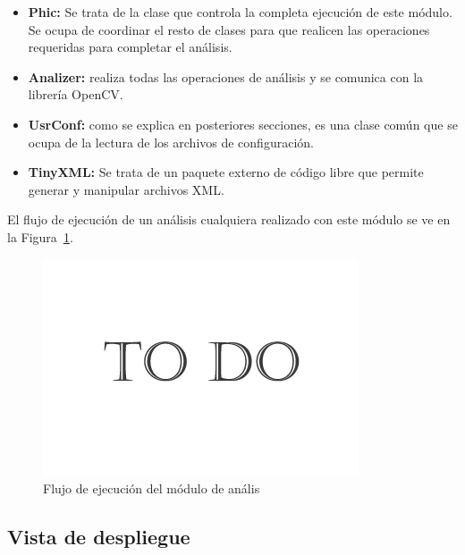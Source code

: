 \begin{itemize}

	\item \textbf{Phic:} Se trata de la clase que controla la completa ejecución de este módulo. Se ocupa de coordinar el resto de clases para que realicen las operaciones requeridas para completar el análisis.
	
	\item \textbf{Analizer:} realiza todas las operaciones de análisis y se comunica con la librería OpenCV.
	
	\item \textbf{UsrConf:} como se explica en posteriores secciones, es una clase común que se ocupa de la lectura de los archivos de configuración.
	
	\item \textbf{TinyXML:} Se trata de un paquete externo de código libre que permite generar y manipular archivos XML.
	
\end{itemize}	
			
El flujo de ejecución de un análisis cualquiera realizado con este módulo se ve en la Figura~\ref{fig:diagramaflujoPHIC}.\\

		\begin{figure}[htbp]
		\centering
		\includegraphics[scale=0.47]{graphics/todo.png}
		\caption{Flujo de ejecución del módulo de anális}
		\label{fig:diagramaflujoPHIC}
		\end{figure}
		
		
\subsection{Vista de despliegue}
		
